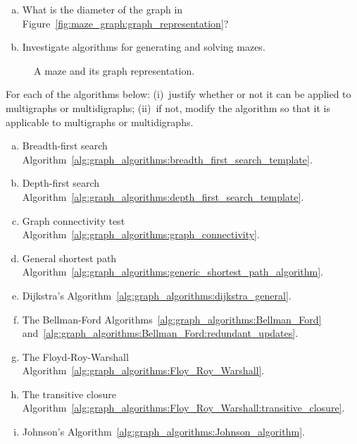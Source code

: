 \begin{problem}
\begin{enumerate}[(a)]
  \item What is the diameter of the graph in
    Figure~\ref{fig:maze_graph:graph_representation}?

  \item Investigate algorithms for generating and solving mazes.
  \end{enumerate}

\begin{figure}[!htbp]
\centering

\caption{A maze and its graph representation.}
\label{fig:graph_algorithms:maze_associated_graph}
\end{figure}

\item For each of the algorithms below: (i)~justify whether or not
  it can be applied to multigraphs or multidigraphs; (ii)~if not,
  modify the algorithm so that it is applicable to multigraphs or
  multidigraphs.
  \begin{enumerate}[(a)]
  \item Breadth-first search
    Algorithm~\ref{alg:graph_algorithms:breadth_first_search_template}.

  \item Depth-first search
    Algorithm~\ref{alg:graph_algorithms:depth_first_search_template}.

  \item Graph connectivity test
    Algorithm~\ref{alg:graph_algorithms:graph_connectivity}.

  \item General shortest path
    Algorithm~\ref{alg:graph_algorithms:generic_shortest_path_algorithm}.

  \item Dijkstra's
    Algorithm~\ref{alg:graph_algorithms:dijkstra_general}.

  \item The Bellman-Ford
    Algorithms~\ref{alg:graph_algorithms:Bellman_Ford}
    and~\ref{alg:graph_algorithms:Bellman_Ford:redundant_updates}.

  \item The Floyd-Roy-Warshall
    Algorithm~\ref{alg:graph_algorithms:Floy_Roy_Warshall}.

  \item The transitive closure
    Algorithm~\ref{alg:graph_algorithms:Floy_Roy_Warshall:transitive_closure}.

  \item Johnson's
    Algorithm~\ref{alg:graph_algorithms:Johnson_algorithm}.
  \end{enumerate}
\end{problem}
